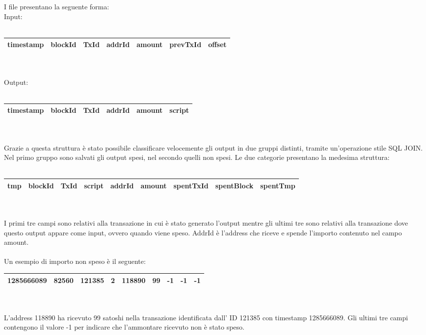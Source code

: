 I file presentano la seguente forma:\\
Input:\\\\
\begin{tabular}{|r|r|r|r|r|r|r|}
\toprule
 timestamp &  blockId &   TxId &  addrId &     amount &  prevTxId &  offset \\
\bottomrule
\end{tabular}\\\\
Output:\\\\
\begin{tabular}{|r|r|r|r|r|r|}
\toprule
 timestamp &  blockId &   TxId &  addrId &     amount &  script \\
\bottomrule
\end{tabular}\\\\
Grazie a questa struttura è stato possibile classificare velocemente gli output in due gruppi distinti, tramite un'operazione stile SQL JOIN. Nel primo gruppo sono salvati gli output spesi, nel secondo quelli non spesi. Le due categorie presentano la medesima struttura:\\\\
\begin{tabular}{|r|r|r|r|r|r|r|r|r|}
\toprule
 tmp &  blockId &   TxId &  script &  addrId &  amount &  spentTxId &  spentBlock &  spentTmp\\
\bottomrule
\end{tabular}\\\\
I primi tre campi sono relativi alla transazione in cui è stato generato l'output mentre gli ultimi tre sono relativi alla transazione dove questo output appare come input, ovvero quando viene speso. AddrId è l'address che riceve e spende l'importo contenuto nel campo amount.\\\\
Un esempio di importo non speso è il seguente:\\
\begin{tabular}{|r|r|r|r|r|r|r|r|r|}
\toprule
1285666089 &    82560 & 121385 &  2 &      118890 &       99 &         -1 &          -1 &              -1 \\
\bottomrule
\end{tabular}\\\\
L'address 118890 ha ricevuto 99 satoshi nella transazione identificata dall' ID 121385 con timestamp 1285666089. Gli ultimi tre campi contengono il valore -1 per indicare che l'ammontare ricevuto non è stato speso. \\
